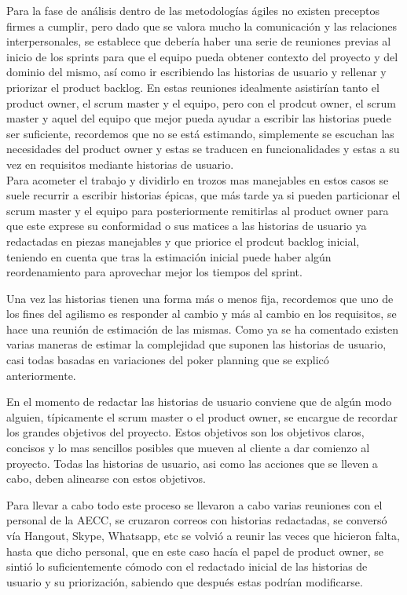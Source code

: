 \documentclass[../pfc.tex]{subfiles}
\begin{document}
	
Para la fase de análisis dentro de las metodologías ágiles no existen preceptos firmes a cumplir, pero dado que se valora mucho la comunicación y las relaciones interpersonales, se establece que debería haber una serie de reuniones previas al inicio de los sprints para que el equipo pueda obtener contexto del proyecto y del dominio del mismo, así como ir escribiendo las historias de usuario y rellenar y priorizar el product backlog. En estas reuniones idealmente asistirían tanto el product owner, el scrum master y el equipo, pero con el prodcut owner, el scrum master y aquel del equipo que mejor pueda ayudar a escribir las historias puede ser suficiente, recordemos que no se está estimando, simplemente se escuchan las necesidades del product owner y estas se traducen en funcionalidades y estas a su vez en requisitos mediante historias de usuario. \\

Para acometer el trabajo y dividirlo en trozos mas manejables en estos casos se suele recurrir a escribir historias épicas, que más tarde ya si pueden particionar el scrum master y el equipo para posteriormente remitirlas al product owner para que este exprese su conformidad o sus matices a las historias de usuario ya redactadas en piezas manejables y que priorice el prodcut backlog inicial, teniendo en cuenta que tras la estimación inicial puede haber algún reordenamiento para aprovechar mejor los tiempos del sprint. 

Una vez las historias tienen una forma más o menos fija, recordemos que uno de los fines del agilismo es responder al cambio y más al cambio en los requisitos, se hace una reunión de estimación de las mismas. Como ya se ha comentado existen varias maneras de estimar la complejidad que suponen las historias de usuario, casi todas basadas en variaciones del poker planning que se explicó anteriormente. 

En el momento de redactar las historias de usuario conviene que de algún modo alguien, típicamente el scrum master o el product owner, se encargue de recordar los grandes objetivos del proyecto. Estos objetivos son los objetivos claros, concisos y lo mas sencillos posibles que mueven al cliente a dar comienzo al proyecto. Todas las historias de usuario, asi como las acciones que se lleven a cabo, deben alinearse con estos objetivos.

Para llevar a cabo todo este proceso se llevaron a cabo varias reuniones con el personal de la AECC, se cruzaron correos con historias redactadas, se conversó vía Hangout, Skype, Whatsapp, etc se volvió a reunir las veces que hicieron falta, hasta que dicho personal, que en este caso hacía el papel de product owner,  se sintió lo suficientemente cómodo con el redactado inicial de las historias de usuario y su priorización, sabiendo que después estas podrían modificarse. 
\end{document}
